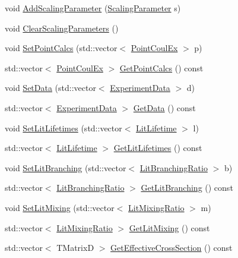 \begin{DoxyCompactItemize}
\item 
void \hyperlink{classCoulExMinFCN_ab59a02517c6b599e4b7b3a944db52546}{Add\-Scaling\-Parameter} (\hyperlink{classScalingParameter}{Scaling\-Parameter} s)
\item 
void \hyperlink{classCoulExMinFCN_a69b535bb8e83e42aa2929a5f51e7d4d1}{Clear\-Scaling\-Parameters} ()
\item 
void \hyperlink{classCoulExMinFCN_a9de9dd0407e4535512ee2c37ac136e1f}{Set\-Point\-Calcs} (std\-::vector$<$ \hyperlink{classPointCoulEx}{Point\-Coul\-Ex} $>$ p)
\item 
std\-::vector$<$ \hyperlink{classPointCoulEx}{Point\-Coul\-Ex} $>$ \hyperlink{classCoulExMinFCN_ad5d143f2aae2e1282e66e7d2e052c2c0}{Get\-Point\-Calcs} () const 
\item 
void \hyperlink{classCoulExMinFCN_a7feea9ef22dc9dc19b6c3d1d8920bf74}{Set\-Data} (std\-::vector$<$ \hyperlink{classExperimentData}{Experiment\-Data} $>$ d)
\item 
std\-::vector$<$ \hyperlink{classExperimentData}{Experiment\-Data} $>$ \hyperlink{classCoulExMinFCN_a71fd7a796f622314d56ba56ed0e40587}{Get\-Data} () const 
\item 
void \hyperlink{classCoulExMinFCN_a54134d9c2323ea1338f7511106b0704b}{Set\-Lit\-Lifetimes} (std\-::vector$<$ \hyperlink{classLitLifetime}{Lit\-Lifetime} $>$ l)
\item 
std\-::vector$<$ \hyperlink{classLitLifetime}{Lit\-Lifetime} $>$ \hyperlink{classCoulExMinFCN_ab613d7df7a2b4219166254dcd48e868a}{Get\-Lit\-Lifetimes} () const 
\item 
void \hyperlink{classCoulExMinFCN_a378c6051a28d0fc3515dec15d1261d5f}{Set\-Lit\-Branching} (std\-::vector$<$ \hyperlink{classLitBranchingRatio}{Lit\-Branching\-Ratio} $>$ b)
\item 
std\-::vector$<$ \hyperlink{classLitBranchingRatio}{Lit\-Branching\-Ratio} $>$ \hyperlink{classCoulExMinFCN_a8f418391c6d2e5801ed3032ff88fb728}{Get\-Lit\-Branching} () const 
\item 
void \hyperlink{classCoulExMinFCN_afcfcae08a68fa14022c340302d78ec5d}{Set\-Lit\-Mixing} (std\-::vector$<$ \hyperlink{classLitMixingRatio}{Lit\-Mixing\-Ratio} $>$ m)
\item 
std\-::vector$<$ \hyperlink{classLitMixingRatio}{Lit\-Mixing\-Ratio} $>$ \hyperlink{classCoulExMinFCN_a5603de360de9f503e9ed2a538652e3d7}{Get\-Lit\-Mixing} () const 
\item 
std\-::vector$<$ T\-Matrix\-D $>$ \hyperlink{classCoulExMinFCN_ac5853fdc98470653111aef353b806166}{Get\-Effective\-Cross\-Section} () const 

\end{DoxyCompactItemize}
